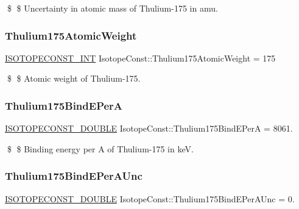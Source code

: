 \$ \$ Uncertainty in atomic mass of Thulium-\/175 in amu. \mbox{\label{group___isotope_const-_thulium-_tm175_gae8410dbb9d673dce553d4d354ca58c47}} 
\subsubsection{\texorpdfstring{Thulium175\+Atomic\+Weight}{Thulium175AtomicWeight}}
{\footnotesize\ttfamily \mbox{\hyperlink{group___isotope_const-_macros_ga5f18360b3e99483a35c32d789e62621c}{I\+S\+O\+T\+O\+P\+E\+C\+O\+N\+S\+T\+\_\+\+I\+NT}} Isotope\+Const\+::\+Thulium175\+Atomic\+Weight = 175}

\$ \$ Atomic weight of Thulium-\/175. \mbox{\label{group___isotope_const-_thulium-_tm175_ga459fab1727cc4e453184a6e019477c71}} 
\subsubsection{\texorpdfstring{Thulium175\+Bind\+E\+PerA}{Thulium175BindEPerA}}
{\footnotesize\ttfamily \mbox{\hyperlink{group___isotope_const-_macros_ga8f45a7272ce02c0b4c65c44636ed719a}{I\+S\+O\+T\+O\+P\+E\+C\+O\+N\+S\+T\+\_\+\+D\+O\+U\+B\+LE}} Isotope\+Const\+::\+Thulium175\+Bind\+E\+PerA = 8061.}

\$ \$ Binding energy per A of Thulium-\/175 in keV. \mbox{\label{group___isotope_const-_thulium-_tm175_gaa5c6029776e91f1906718312db267d65}} 
\subsubsection{\texorpdfstring{Thulium175\+Bind\+E\+Per\+A\+Unc}{Thulium175BindEPerAUnc}}
{\footnotesize\ttfamily \mbox{\hyperlink{group___isotope_const-_macros_ga8f45a7272ce02c0b4c65c44636ed719a}{I\+S\+O\+T\+O\+P\+E\+C\+O\+N\+S\+T\+\_\+\+D\+O\+U\+B\+LE}} Isotope\+Const\+::\+Thulium175\+Bind\+E\+Per\+A\+Unc = 0.}

